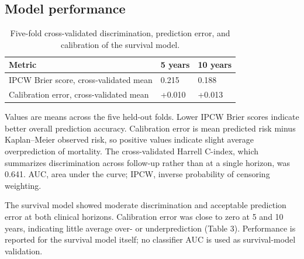 \documentclass[9pt,twocolumn]{extarticle}
\begin{document}
\subsection{Model performance}
\begin{table}[t]
\centering
\caption{Five-fold cross-validated discrimination, prediction error, and calibration of the survival model.}
\small
\begin{tabularx}{\columnwidth}{@{}XXX@{}}
\toprule
\textbf{Metric} & \textbf{5 years} & \textbf{10 years} \\
\midrule
IPCW Brier score, cross-validated mean & 0.215 & 0.188 \\
Calibration error, cross-validated mean & +0.010 & +0.013 \\
\bottomrule
\end{tabularx}
\end{table}
Values are means across the five held-out folds. Lower IPCW Brier scores indicate better overall prediction accuracy. Calibration error is mean predicted risk minus Kaplan--Meier observed risk, so positive values indicate slight average overprediction of mortality. The cross-validated Harrell C-index, which summarizes discrimination across follow-up rather than at a single horizon, was 0.641. AUC, area under the curve; IPCW, inverse probability of censoring weighting.\par
The survival model showed moderate discrimination and acceptable prediction error at both clinical horizons. Calibration error was close to zero at 5 and 10 years, indicating little average over- or underprediction (Table 3). Performance is reported for the survival model itself; no classifier AUC is used as survival-model validation.\par
\end{document}
